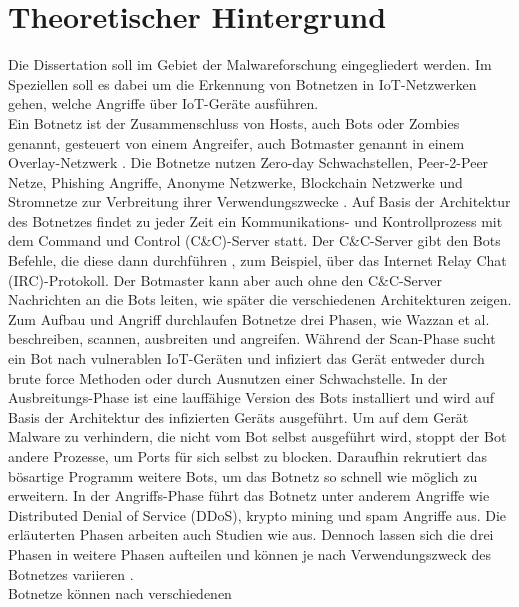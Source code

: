 \section{Theoretischer Hintergrund}
\label{sec:theory}

Die Dissertation soll im Gebiet der Malwareforschung eingegliedert werden. Im Speziellen soll es dabei um die Erkennung von Botnetzen in IoT-Netzwerken
gehen, welche Angriffe über IoT-Geräte ausführen. \\ Ein Botnetz ist der Zusammenschluss von Hosts, auch Bots oder Zombies genannt, gesteuert von einem Angreifer,
auch Botmaster genannt in einem Overlay-Netzwerk \cite{Xing2021SurveyOB}. Die Botnetze nutzen Zero-day Schwachstellen, Peer-2-Peer Netze, Phishing Angriffe, Anonyme Netzwerke,
Blockchain Netzwerke und Stromnetze zur Verbreitung ihrer Verwendungszwecke \cite{DBLP:conf/cycon/CasenoveM14,DBLP:conf/esorics/KurtECAU20}. Auf Basis der Architektur
des Botnetzes findet zu jeder Zeit ein Kommunikations- und Kontrollprozess mit dem Command und Control (C\&C)-Server statt. Der C\&C-Server gibt den Bots Befehle, die
diese dann durchführen \cite{SCHILLER200729}, zum Beispiel, über das Internet Relay Chat (IRC)-Protokoll. Der Botmaster kann aber auch ohne den C\&C-Server Nachrichten an die Bots leiten, wie
später die verschiedenen Architekturen zeigen. \\ Zum Aufbau und Angriff durchlaufen Botnetze drei Phasen, wie Wazzan et al.
\cite{Wazzan2021InternetOT} beschreiben, scannen, ausbreiten und angreifen. Während der Scan-Phase sucht ein Bot nach vulnerablen IoT-Geräten und 
infiziert das Gerät entweder durch brute force Methoden oder durch Ausnutzen einer Schwachstelle.
In der Ausbreitungs-Phase ist eine lauffähige Version des Bots installiert und wird auf Basis der Architektur des infizierten Geräts ausgeführt.
Um auf dem Gerät Malware zu verhindern, die nicht vom Bot selbst ausgeführt wird, stoppt der Bot andere Prozesse, um Ports für sich selbst zu blocken.
Daraufhin rekrutiert das bösartige Programm weitere Bots, um das Botnetz so schnell wie möglich zu erweitern. In der Angriffs-Phase führt das Botnetz unter anderem Angriffe wie Distributed Denial of
Service (DDoS), krypto mining und spam Angriffe aus. Die erläuterten Phasen arbeiten auch Studien wie \cite{10.1007/978-3-030-33229-7_21, Alzahrani2020,DBLP:journals/computer/VlajicZ18,NGUYEN2020128} 
aus. Dennoch lassen sich die drei Phasen in weitere Phasen aufteilen und können je nach Verwendungszweck des Botnetzes variieren \cite{Wazzan2021InternetOT}.\\ Botnetze können nach verschiedenen
